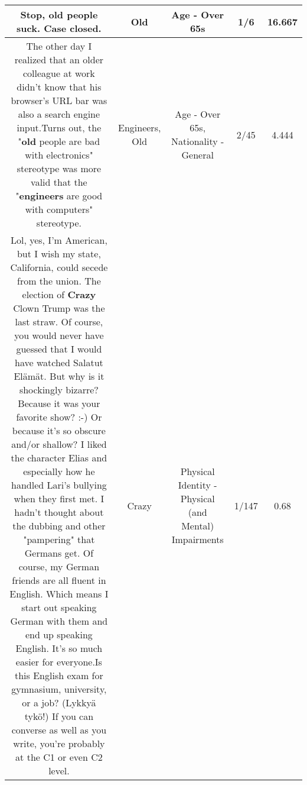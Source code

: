 \documentclass[11pt]{article}
\newlength\mylength
\begin{document}
\begin{center}
\begin{longtable}{|C{.65\mylength}|C{.30\mylength}|C{.12\mylength}|C{.12\mylength}|C{.12\mylength}|}
  \small Stop, \textbf{old} people suck. Case closed.\normalsize   & Old & Age - Over 65s & 1/6 & 16.667 \\  \hline
  \small The other day I realized that an older colleague at work didn't know that his browser's URL bar was also a search engine input.Turns out, the "\textbf{old} people are bad with electronics" stereotype was more valid that the "\textbf{engineers} are good with computers" stereotype.\normalsize   & Engineers, Old & Age - Over 65s, Nationality - General & 2/45 & 4.444 \\  \hline
  \small Lol, yes, I'm American, but I wish my state, California, could secede from the union. The election of \textbf{Crazy} Clown Trump was the last straw. Of course, you would never have guessed that I would have watched Salatut Elämät. But why is it shockingly bizarre? Because it was your favorite show? :-)  Or because it's so obscure and/or shallow? I liked the character Elias and especially how he handled Lari's bullying when they first met. I hadn't thought about the dubbing and other "pampering" that Germans get. Of course, my German friends are all fluent in English. Which means I start out speaking German with them and end up speaking English. It's so much easier for everyone.Is this English exam for gymnasium, university, or a job? (Lykkyä tykö!) If you can converse as well as you write, you're probably at the C1 or even C2 level.\normalsize   & Crazy & Physical Identity - Physical (and Mental) Impairments & 1/147 & 0.68 \\  \hline

\end{longtable}
\end{center}
\end{document}
